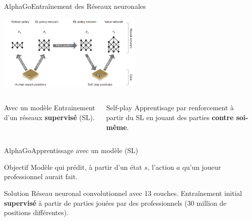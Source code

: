 \begin{frame}{AlphaGo}{Entraînement des Réseaux neuronales}
    \begin{center}
        \includegraphics[width=7cm]{ressources/AlphaGo/Entrainement}
        \begin{columns}[t]
            \begin{column}{.4\textwidth}
                \begin{block}{Avec un modèle}
                    Entrainement d'un réseaux \textbf{supervisé} (SL).
                \end{block}
            \end{column}
            \begin{column}{.4\textwidth}
                \begin{block}{Self-play}
                    Apprentisage par renforcement à partir du SL en jouant des parties \textbf{contre soi-même}.
                \end{block}
            \end{column}
        \end{columns}

    \end{center}
\end{frame}


\begin{frame}{AlphaGo}{Apprentissage avec un modèle (SL)}
    \begin{center}

        \begin{block}{Objectif}
            Modèle qui prédit, à partir d'un état $s$, l'action $a$ qu'un joueur professionnel aurait fait.
        \end{block}
        \vspace{1cm}
        \begin{block}{Solution}
            Réseau neuronal convolutionnel avec 13 couches.
            Entraînement initial \textbf{supervisé} à partir de parties jouées par des professionnels (30 million de positions différentes).
        \end{block}
    \end{center}
\end{frame}

